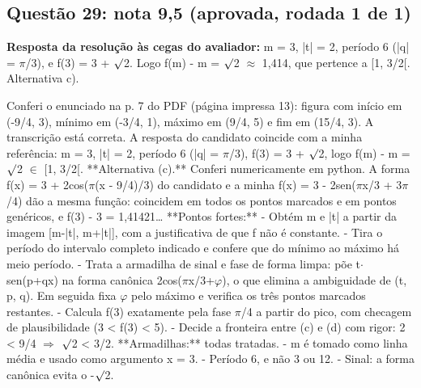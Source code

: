 \documentclass{article}%
\begin{document}
\subsection*{Questão 29: nota 9,5 (aprovada, rodada 1 de 1)}%
\textbf{Resposta da resolução às cegas do avaliador:} m = 3, |t| = 2, período 6 (|q| = $\pi$/3), e f(3) = 3 + $\surd$2. Logo f(m) - m = $\surd$2 $\approx$ 1,414, que pertence a {[}1, 3/2{[}. Alternativa c).\par %
Conferi o enunciado na p. 7 do PDF (página impressa 13): figura com início em (-9/4, 3), mínimo em (-3/4, 1), máximo em (9/4, 5) e fim em (15/4, 3). A transcrição está correta.\newline%
\newline%
A resposta do candidato coincide com a minha referência: m = 3, |t| = 2, período 6 (|q| = $\pi$/3), f(3) = 3 + $\surd$2, logo f(m) - m = $\surd$2 $\in$ {[}1, 3/2{[}. **Alternativa (c).** Conferi numericamente em python. A forma f(x) = 3 + 2cos($\pi$(x - 9/4)/3) do candidato e a minha f(x) = 3 - 2sen($\pi$x/3 + 3$\pi$/4) dão a mesma função: coincidem em todos os pontos marcados e em pontos genéricos, e f(3) - 3 = 1,41421\ldots{}\newline%
\newline%
**Pontos fortes:**\newline%
{-} Obtém m e |t| a partir da imagem {[}m-|t|, m+|t|{]}, com a justificativa de que f não é constante.\newline%
{-} Tira o período do intervalo completo indicado e confere que do mínimo ao máximo há meio período.\newline%
{-} Trata a armadilha de sinal e fase de forma limpa: põe t$\cdot$sen(p+qx) na forma canônica 2cos($\pi$x/3+$\varphi$), o que elimina a ambiguidade de (t, p, q). Em seguida fixa $\varphi$ pelo máximo e verifica os três pontos marcados restantes.\newline%
{-} Calcula f(3) exatamente pela fase $\pi$/4 a partir do pico, com checagem de plausibilidade (3 < f(3) < 5).\newline%
{-} Decide a fronteira entre (c) e (d) com rigor: 2 < 9/4 $\Rightarrow$ $\surd$2 < 3/2.\newline%
\newline%
**Armadilhas:** todas tratadas.\newline%
{-} m é tomado como linha média e usado como argumento x = 3.\newline%
{-} Período 6, e não 3 ou 12.\newline%
{-} Sinal: a forma canônica evita o -$\surd$2.\newline%
\end{document}
